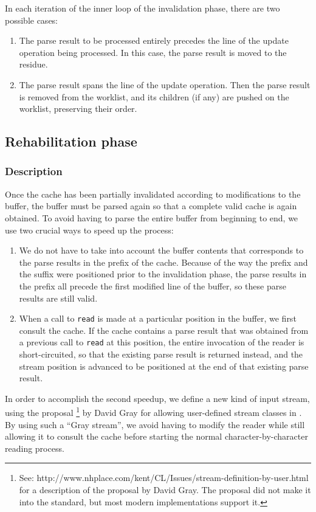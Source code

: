 In each iteration of the inner loop of the invalidation phase, there
are two possible cases:

\begin{enumerate}
\item The parse result to be processed entirely precedes the line of
  the update operation being processed.  In this case, the parse
  result is moved to the residue.
\item The parse result spans the line of the update operation.  Then
  the parse result is removed from the worklist, and its children (if
  any) are pushed on the worklist, preserving their order.
\end{enumerate}

\subsection{Rehabilitation phase}

\subsubsection{Description}

Once the cache has been partially invalidated according to
modifications to the buffer, the buffer must be parsed again so that a
complete valid cache is again obtained.  To avoid having to parse the
entire buffer from beginning to end, we use two crucial ways to speed
up the process:

\begin{enumerate}
\item We do not have to take into account the buffer contents that
  corresponds to the parse results in the prefix of the cache.
  Because of the way the prefix and the suffix were positioned prior
  to the invalidation phase, the parse results in the prefix all
  precede the first modified line of the buffer, so these parse
  results are still valid.
\item When a call to \texttt{read} is made at a particular position in
  the buffer, we first consult the cache.  If the cache contains a
  parse result that was obtained from a previous call to \texttt{read}
  at this position, the entire invocation of the reader is
  short-circuited, so that the existing parse result is returned
  instead, and the stream position is advanced to be positioned at the
  end of that existing parse result.
\end{enumerate}

In order to accomplish the second speedup, we define a new kind of
input stream, using the proposal%
\footnote{See:
  http://www.nhplace.com/kent/CL/Issues/stream-definition-by-user.html
  for a description of the proposal by David Gray.  The proposal did
  not make it into the \commonlisp{} standard, but most modern
  implementations support it.}
 by David Gray for allowing user-defined stream classes in
 \commonlisp{}.  By using such a ``Gray stream'', we avoid having to
 modify the reader while still allowing it to consult the cache before
 starting the normal character-by-character reading process.

